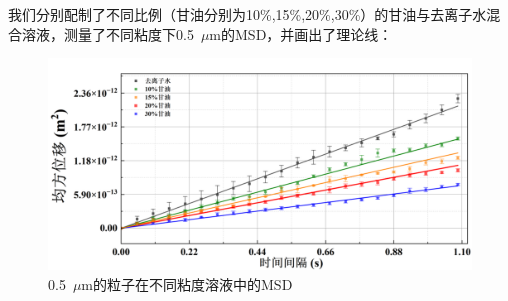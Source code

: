 \documentclass[a4paper]{report} %
\begin{document}
我们分别配制了不同比例（甘油分别为10\%,15\%,20\%,30\%）的甘油与去离子水混合溶液，测量了不同粘度下0.5~$\mu$m的MSD，并画出了理论线：\par
\begin{figure}[H]
    \centering
    \includegraphics[width=0.8\linewidth]{实验数据拟合2.png}
    \caption{0.5~$\mu$m的粒子在不同粘度溶液中的MSD}
    \label{fig:fit2}
\end{figure}
\end{document}
